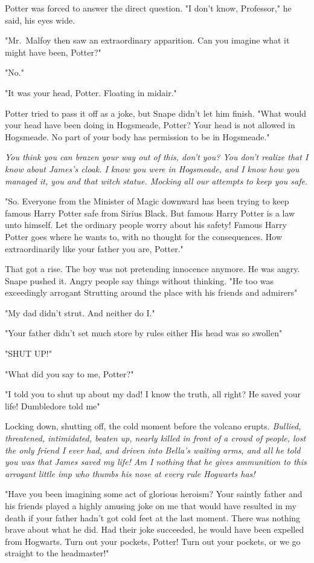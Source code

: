 Potter was forced to answer the direct question. "I don't know, Professor," he said, his eyes wide.

"Mr.~Malfoy then saw an extraordinary apparition. Can you imagine what it might have been, Potter?"

"No."

"It was your head, Potter. Floating in midair."

Potter tried to pass it off as a joke, but Snape didn't let him finish. "What would your head have been doing in Hogsmeade, Potter? Your head is not allowed in Hogsmeade. No part of your body has permission to be in Hogsmeade."

\emph{You think you can brazen your way out of this, don't you? You don't realize that I know about James's cloak. I know you were in Hogsmeade, and I know how you managed it, you and that witch statue. Mocking all our attempts to keep you safe.}

"So. Everyone from the Minister of Magic downward has been trying to keep famous Harry Potter safe from Sirius Black. But famous Harry Potter is a law unto himself. Let the ordinary people worry about his safety! Famous Harry Potter goes where he wants to, with no thought for the consequences. How extraordinarily like your father you are, Potter."

That got a rise. The boy was not pretending innocence anymore. He was angry. Snape pushed it. Angry people say things without thinking. "He too was exceedingly arrogant{\el} Strutting around the place with his friends and admirers{\el}"

"My dad didn't strut. And neither do I."

"Your father didn't set much store by rules either{\el} His head was so swollen{\el}"

"SHUT UP!"

"What did you say to me, Potter?"

"I told you to shut up about my dad! I know the truth, all right? He saved your life! Dumbledore told me{\el}"

Locking down, shutting off, the cold moment before the volcano erupts. \emph{Bullied, threatened, intimidated, beaten up, nearly killed in front of a crowd of people, lost the only friend I ever had, and driven into Bella's waiting arms, and all he told you was that James saved my life! Am I nothing that he gives ammunition to this arrogant little imp who thumbs his nose at every rule Hogwarts has!}

"Have you been imagining some act of glorious heroism? Your saintly father and his friends played a highly amusing joke on me that would have resulted in my death if your father hadn't got cold feet at the last moment. There was nothing brave about what he did. Had their joke succeeded, he would have been expelled from Hogwarts. Turn out your pockets, Potter! Turn out your pockets, or we go straight to the headmaster!"

